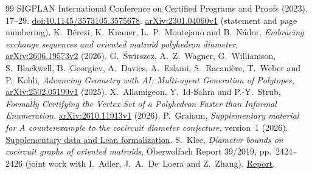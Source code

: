 \documentclass[11pt]{article}
\theoremstyle{remark}
\begin{document}
\begin{thebibliography}{99}
SIGPLAN International Conference on Certified Programs and Proofs (2023), 17--29.
\href{https://doi.org/10.1145/3573105.3575678}{doi:10.1145/3573105.3575678}.
\href{https://arxiv.org/abs/2301.04060v1}{arXiv:2301.04060v1}
(statement and page numbering).
K.~B\'erczi, K.~Knauer, L.~P.~Montejano and B.~N\'ador,
\emph{Embracing exchange sequences and oriented matroid polyhedron diameter},
\href{https://arxiv.org/abs/2606.19573v2}{arXiv:2606.19573v2} (2026).
G.~\'Swirszcz, A.~Z.~Wagner, G.~Williamson, S.~Blackwell, B.~Georgiev,
A.~Davies, A.~Eslami, S.~Racani\`ere, T.~Weber and P.~Kohli,
\emph{Advancing Geometry with AI: Multi-agent Generation of Polytopes},
\href{https://arxiv.org/abs/2502.05199v1}{arXiv:2502.05199v1} (2025).
X.~Allamigeon, Y.~Id-Sahra and P.-Y.~Strub,
\emph{Formally Certifying the Vertex Set of a Polyhedron Faster than Informal
Enumeration},
\href{https://arxiv.org/abs/2610.11913v1}{arXiv:2610.11913v1} (2026).
P.~Graham, \emph{Supplementary material for A counterexample to the cocircuit
diameter conjecture}, version~1 (2026).
\href{https://github.com/6/clank-lab/tree/cocircuit-diameter-counterexample-v1/results/cocircuit-diameter-counterexample}{Supplementary data and Lean formalization}.
S.~Klee, \emph{Diameter bounds on cocircuit graphs of oriented matroids},
Oberwolfach Report 39/2019, pp.~2424--2426 (joint work with I.~Adler,
J.~A.~De~Loera and Z.~Zhang).
\href{https://ems.press/content/serial-article-files/46818}{Report}.
\end{thebibliography}
\end{document}
